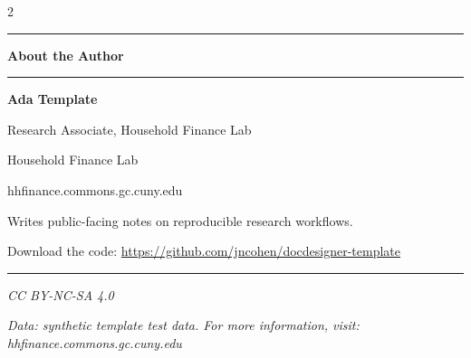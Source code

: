 \documentclass[12pt]{article}
\def\docdesignersnapshotlicense{CC BY-NC-SA 4.0}
\begin{document}
\begin{paracol}{2}
\switchcolumn[1]
\vspace*{\fill}
\par\vspace{0.55em}
\noindent\textcolor{docdesignerrule}{\rule{\linewidth}{0.45pt}}\par
\vspace{0.25em}
{\scriptsize\bfseries\color{docdesigneraccent} About the Author}\par
\vspace{0.2em}
\begin{minipage}{\linewidth}
\scriptsize\singlespacing
\begin{minipage}[c]{0.20\linewidth}
\colorbox{docdesigneraccent!10}{\rule{0pt}{0.58in}\rule{0.58in}{0pt}}
\end{minipage}\hfill
\begin{minipage}[c]{0.74\linewidth}
\textbf{Ada Template}\par
{Research Associate, Household Finance Lab}\par
{Household Finance Lab}\par
{\color{docdesigneraccent}hhfinance.commons.gc.cuny.edu}\par
Writes public-facing notes on reproducible research workflows.
\end{minipage}
\end{minipage}\par
\vspace{0.35em}
{\scriptsize\singlespacing Download the code: {\color{docdesigneraccent}\url{https://github.com/jncohen/docdesigner-template}}\par}
\end{paracol}
\vfill
\noindent\textcolor{docdesignerrule}{\rule{\textwidth}{0.7pt}}\par
\vspace{0.15em}
\noindent
\begin{minipage}[t]{0.47\textwidth}
\scriptsize\raggedright\itshape
\docdesignersnapshotlicense
\end{minipage}\hfill
\begin{minipage}[t]{0.47\textwidth}
\scriptsize\raggedleft\itshape
Data: synthetic template test data. For more information, visit:
hhfinance.commons.gc.cuny.edu
\end{minipage}\par
\endgroup
\restoregeometry


\end{document}
